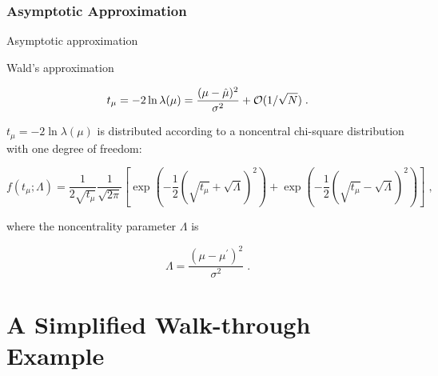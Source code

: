 \subsubsection*{Asymptotic Approximation}
Asymptotic approximation \cite{Cowan2011}

\noindent Wald's approximation \cite{Wald1943}

\begin{equation}
\label{eq:wald}
t_{\mu} = -2 \ln \lambda(\mu)
= \frac{(\mu - \hat{\mu})^2}{\sigma^2} + {\cal  O}(1/\sqrt{N}) \;.
\end{equation}

 $t_{\mu} = -2 \ln \lambda(\mu)$ is distributed according to a noncentral chi-square distribution with one degree of freedom:

\begin{equation}
\label{eq:stat:ftmulambda}
f(t_{\mu};\Lambda) = \frac{1}{2 \sqrt{t_{\mu}}} \frac{1}{\sqrt{2 \pi}}
\left[ \exp \left( - \frac{1}{2}
\left( \sqrt{t_{\mu}} + \sqrt{\Lambda} \right)^2 \right) +
\exp \left( - \frac{1}{2} \left( \sqrt{t_{\mu}} - \sqrt{\Lambda} \right)^2
\right) \right] \;,
\end{equation}

\noindent where the noncentrality parameter $\Lambda$ is

\begin{equation}
\label{eq:stat:noncentrality}
\Lambda = \frac{(\mu - \mu^{\prime})^2}{\sigma^2} \;.
\end{equation}


\section{A Simplified Walk-through Example}

